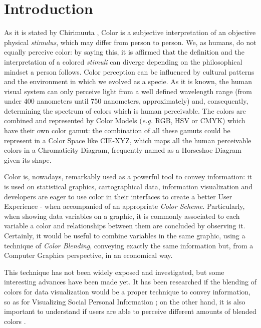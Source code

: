 
\section{Introduction}
\label{sec:introduction}
%
As it is stated by Chirimuuta \cite{Chirimuuta2014}, Color is a subjective interpretation of an objective physical
\emph{stimulus}, which may differ from person to person. We, as humans, do not equally perceive color: by saying
this, it is affirmed that the definition and the interpretation of a colored \emph{stimuli} can diverge depending
on the philosophical mindset a person follows. Color perception can be influenced by cultural patterns and the
environment in which we evolved as a specie.
As it is known, the human visual system can only perceive light from a well defined wavelength range (from under 400
nanometers until 750 nanometers, approximately) and, consequently, determining the spectrum of colors which is human
perceivable. The colors are combined and represented by Color Models (\emph{e.g.} RGB, HSV or CMYK) which have their
own color gamut: the combination of all these gamuts could be represent in a Color Space like CIE-XYZ, which maps all
the human perceivable colors in a Chromaticity Diagram, frequently named as a Horseshoe Diagram given its shape. \par
%
Color is, nowadays, remarkably used as a powerful tool to convey information: it is used on statistical graphics,
cartographical data, information visualization and developers are eager to use color in their interfaces to
create a better User Experience - when accompanied of an appropriate \emph{Color Scheme}. Particularly, when
showing data variables on a graphic, it is commonly associated to each variable a color and relationships between
them are concluded by observing it. Certainly, it would be useful to combine variables in the same graphic, using
a technique of \emph{Color Blending}, conveying exactly the same information but, from a Computer Graphics
perspective, in an economical way. \par
%
This technique has not been widely exposed and investigated, but some interesting advances have been made yet. It
has been researched if the blending of colors for data visualization \cite{Gama20141} would be a proper technique
to convey information, so as for Visualizing Social Personal Information \cite{Gama20143}; on the other hand, it
is also important to understand if users are able to perceive different amounts of blended colors \cite{Gama20142}. \par

